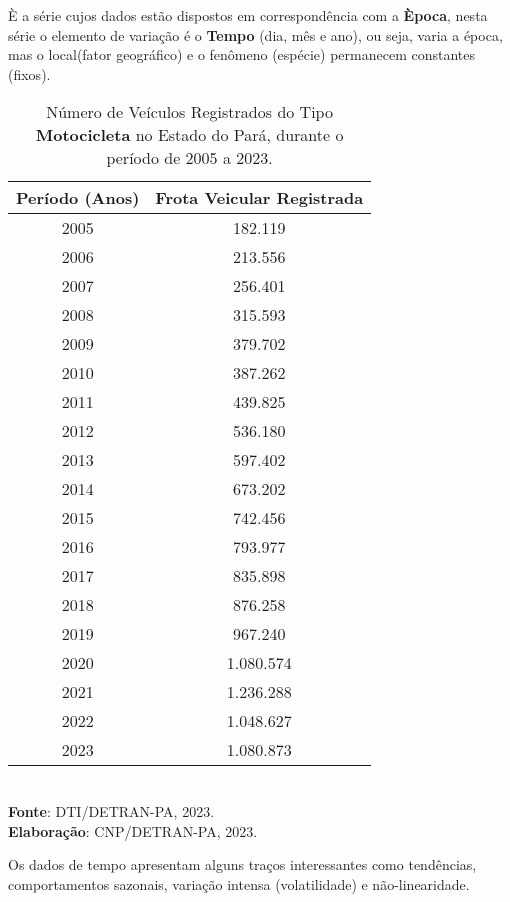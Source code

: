 \inic È a série cujos dados estão dispostos em correspondência
com a \textbf{Època}, nesta série o elemento de variação é o \textbf{Tempo} (dia,
mês e ano), ou seja, varia a época, mas o local(fator geográfico) e o fenômeno (espécie)
permanecem constantes (fixos).


\begin{table}[!htb]
    \centering
    {
    \caption{Número de Veículos Registrados do Tipo \textbf{Motocicleta} no Estado do Pará, durante o período de 2005 a 2023.}
    \label{obitos}
    \vspace{0.1cm}
\begin{tabular}{c|c}
  \hline\hline
  Período (Anos)   & Frota Veicular Registrada \\
  \hline\hline
  2005   & 182.119   \\
  2006   & 213.556   \\
  2007   &  256.401  \\
  2008   &  315.593  \\
  2009   &  379.702 \\
  2010   & 387.262  \\
  2011   & 439.825 \\
  2012   & 536.180  \\
  2013   & 597.402  \\
  2014   & 673.202 \\
  2015   & 742.456 \\
  2016   & 793.977 \\
  2017   & 835.898 \\
  2018   & 876.258 \\
  2019   & 967.240 \\
  2020   & 1.080.574 \\
  2021   & 1.236.288 \\
  2022   & 1.048.627   \\
  2023   & 1.080.873    \\
  \hline\hline
\end{tabular}}
\\
\hspace{-2.5cm}
\textbf{Fonte}: DTI/DETRAN-PA, 2023. \\
\hspace{-1.6cm}
\textbf{Elaboração}: CNP/DETRAN-PA, 2023.
\end{table}


Os dados de tempo apresentam alguns traços interessantes como tendências, comportamentos sazonais, variação intensa (volatilidade) e não-linearidade.\vskip0.3cm






